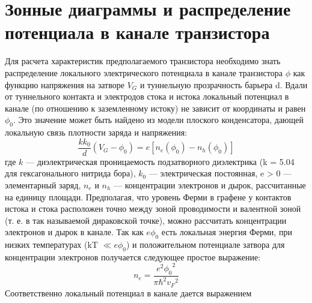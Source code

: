 \documentclass[a4paper,12pt]{article} %
\begin{document}
\section{Зонные диаграммы и распределение потенциала в канале транзистора}
\noindent Для расчета характеристик предполагаемого транзистора необходимо знать распределение локального электрического потенциала в канале транзистора $\phi$ как функцию напряжения на затворе $V_G$ и туннельную прозрачность барьера d. Вдали от туннельного контакта и электродов стока и истока локальный потенциал в канале (по отношению к заземленному истоку) не зависит от координаты и равен $\phi_0$. Это значение может быть найдено из модели плоского конденсатора, дающей локальную связь плотности заряда и напряжения:
$$ \frac{kk_0}{d} (V_G-\phi_0) = e[n_e(\phi_0)-n_h(\phi_0)]$$
\noindent где $k$ — диэлектрическая проницаемость подзатворного диэлектрика (k = 5.04 для гексагонального нитрида бора), $k_0$ — электрическая постоянная, e > 0 — элементарный заряд, $n_e$ и $n_h$ — концентрации электронов и дырок, рассчитанные на единицу площади. Предполагая, что уровень Ферми в графене у контактов истока и стока расположен точно между зоной проводимости и валентной зоной (т. е. в так называемой дираковской точке), можно рассчитать концентрации электронов и дырок в канале. Так как $e\phi_0$ есть локальная энергия Ферми, при низких температурах (kT $\ll eϕ_0$) и положительном потенциале затвора для концентрации электронов получается следующее простое выражение:
$$n_e = \frac{e^2 {\phi_0}^2}{\pi \hbar^2 {v_F}^2}$$
\noindent Соответственно локальный потенциал в канале дается выражением
\begin{figure}[h!]
\end{figure}
\end{document}
